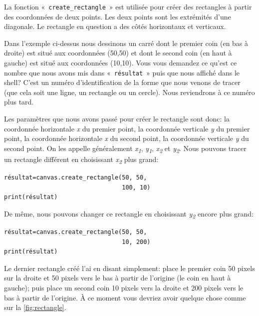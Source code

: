 La fonction «~\texttt{create\_rectangle}~» est utilisée pour créer des rectangles à partir des coordonnées de deux points. Les deux points sont les extrémités d'une diagonale. Le rectangle en question a des côtés horizontaux et verticaux.

Dans l'exemple ci-dessus nous dessinons un carré dont le premier coin (en bas à droite) est situé aux coordonnées (50,50) et dont le second coin (en haut à gauche) est situé aux coordonnées (10,10).
Vous vous demandez ce qu'est ce nombre que nous avons mis dans «~\texttt{résultat}~» puis que nous affiché dans le shell? C'est un numéro d'identification de la forme que nous venons de tracer (que cela soit une ligne, un rectangle ou un cercle). Nous reviendrons à ce numéro plus tard.

Les paramètres que nous avons passé pour créer le rectangle sont donc: la coordonnée horizontale \emph{x} du premier point, la coordonnée verticale \emph{y} du premier point, la coordonnée horizontale \emph{x} du second point, la coordonnée verticale \emph{y} du second point. On les appelle généralement \emph{x\textsubscript{1}}, \emph{y\textsubscript{1}}, \emph{x\textsubscript{2}} et \emph{y\textsubscript{2}}. Nous pouvons tracer un rectangle différent en choisissant \emph{x\textsubscript{2}} plus grand:

\begin{Verbatim}[frame=single,rulecolor=\color{mbleu}, label=à taper]
résultat=canvas.create_rectangle(50, 50, 
                                 100, 10)
print(résultat)
\end{Verbatim}

De même, nous pouvons changer ce rectangle en choisissant \emph{y\textsubscript{2}} encore plus grand:

\begin{Verbatim}[frame=single,rulecolor=\color{mbleu}, label=à taper]
résultat=canvas.create_rectangle(50, 50, 
                                 10, 200)
print(résultat)
\end{Verbatim}


Le dernier rectangle créé l'ai en disant simplement: place le premier coin 50 pixels sur la droite et 50 pixels vers le bas à partir de l'origine (le coin en haut à gauche); puis place un second coin 10 pixels vers la droite et 200 pixels vers le bas à partir de l'origine. À ce moment vous devriez avoir quelque chose comme sur la \autoref{fig:rectangle}.

